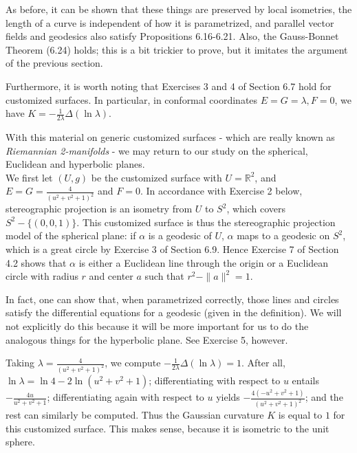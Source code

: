 \documentclass[leqno]{book}
\begin{document}
As before, it can be shown that these things are preserved by local isometries, the length of a curve is independent of how it is parametrized, and parallel vector fields and geodesics also satisfy Propositions 6.16-6.21.  Also, the Gauss-Bonnet Theorem (6.24) holds; this is a bit trickier to prove, but it imitates the argument of the previous section.

Furthermore, it is worth noting that Exercises 3 and 4 of Section 6.7 hold for customized surfaces.  In particular, in conformal coordinates $E=G=\lambda,F=0$, we have $K=-\frac 1{2\lambda}\Delta(\ln\lambda)$.

With this material on generic customized surfaces \-- which are really known as \emph{Riemannian 2-manifolds} \-- we may return to our study on the spherical, Euclidean and hyperbolic planes.\\

\noindent We first let $(U,g)$ be the customized surface with $U=\mathbb R^2$, and $E=G=\frac 4{(u^2+v^2+1)^2}$ and $F=0$.  In accordance with Exercise 2 below, stereographic projection is an isometry from $U$ to $S^2$, which covers $S^2-\{(0,0,1)\}$.  This customized surface is thus the stereographic projection model of the spherical plane: if $\alpha$ is a geodesic of $U$, $\alpha$ maps to a geodesic on $S^2$, which is a great circle by Exercise 3 of Section 6.9.  Hence Exercise 7 of Section 4.2 shows that $\alpha$ is either a Euclidean line through the origin or a Euclidean circle with radius $r$ and center $a$ such that $r^2-\|a\|^2=1$.

In fact, one can show that, when parametrized correctly, those lines and circles satisfy the differential equations for a geodesic (given in the definition).  We will not explicitly do this because it will be more important for us to do the analogous things for the hyperbolic plane.  See Exercise 5, however.

Taking $\lambda=\frac 4{(u^2+v^2+1)^2}$, we compute $-\frac 1{2\lambda}\Delta(\ln\lambda)=1$.  After all, $\ln\lambda=\ln 4-2\ln(u^2+v^2+1)$; differentiating with respect to $u$ entails $-\frac{4u}{u^2+v^2+1}$; differentiating again with respect to $u$ yields $-\frac{4(-u^2+v^2+1)}{(u^2+v^2+1)^2}$; and the rest can similarly be computed.  Thus the Gaussian curvature $K$ is equal to $1$ for this customized surface.  This makes sense, because it is isometric to the unit sphere.
\end{document}
